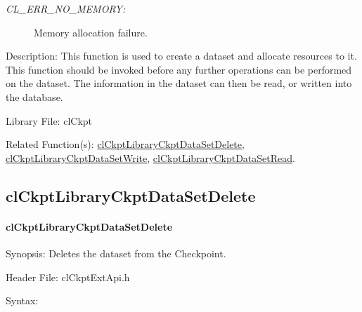 \begin{flushleft}
\begin{Desc}
\begin{description}
\item[{\em CL\_\-ERR\_\-NO\_\-MEMORY:}]Memory allocation failure.\end{description}
\end{Desc}
\begin{Desc}
\item[Description:]This function is used to create a dataset and allocate resources to it. This function should be invoked before any further
operations can be performed on the dataset. The information in the dataset can then be read, or written into the database.\end{Desc}
\begin{Desc}
\item[Library File:]cl\-Ckpt\end{Desc}
\begin{Desc}
\item[Related Function(s):]\hyperlink{pageckpt206}{cl\-Ckpt\-Library\-Ckpt\-Data\-Set\-Delete}, 
\hyperlink{pageckpt207}{cl\-Ckpt\-Library\-Ckpt\-Data\-Set\-Write}, \hyperlink{pageckpt208}{cl\-Ckpt\-Library\-Ckpt\-Data\-Set\-Read}. \end{Desc}
\newpage


\subsection{clCkptLibraryCkptDataSetDelete}
\hypertarget{pageckpt206}{}\paragraph{cl\-Ckpt\-Library\-Ckpt\-Data\-Set\-Delete}\label{pageckpt206}
\begin{Desc}
\item[Synopsis:]Deletes the dataset from the Checkpoint.\end{Desc}
\begin{Desc}
\item[Header File:]clCkptExtApi.h\end{Desc}
\begin{Desc}
\item[Syntax:]


\end{Desc}
\end{flushleft}

